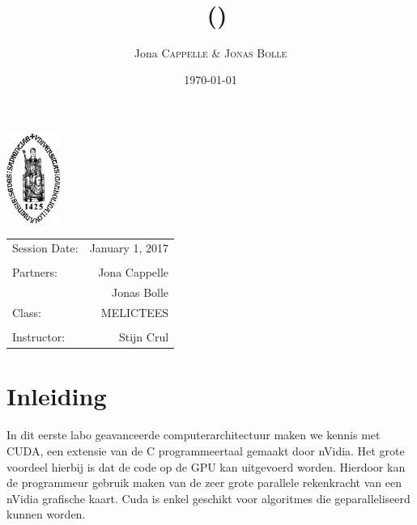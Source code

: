 \documentclass[twoside,a4paper]{article}
\title{\maintitle \\ \course \\{\small\ (\coursenumber)}} %
\author{Jona \textsc{Cappelle} \& \textsc{Jonas Bolle}} %
\date{\today} %
\newcommand{\class}{MELICTEES}
\begin{document}
\sloppy %
\begin{titlepage}
\maketitle %

\vfill
\begin{center}
\includegraphics[width=0.13\textwidth]{logo_kuleuven.png} %
\end{center}
\vfill
\vfill
\vfill

\begin{center}
\begin{tabular}{l r}
Session Date: & January 1, 2017 \\ %
\\
Partners: &  Jona Cappelle\\ %
&  Jonas Bolle\\
Class: & \class \\
\\
Instructor: &  Stijn Crul%
\end{tabular}
\end{center}
\vfill
\vfill
\end{titlepage}
\clearpage
\newpage\null\thispagestyle{empty}\newpage %



\restoregeometry%

\tableofcontents
\listoffigures
\clearpage

\section{Inleiding}
In dit eerste labo geavanceerde computerarchitectuur maken we kennis met CUDA, een extensie van de C programmeertaal gemaakt door nVidia. Het grote voordeel hierbij is dat de code op de GPU kan uitgevoerd worden. Hierdoor kan de programmeur gebruik maken van de zeer grote parallele rekenkracht van een nVidia grafische kaart. Cuda is enkel geschikt voor algoritmes die geparalleliseerd kunnen worden.
\end{document}
